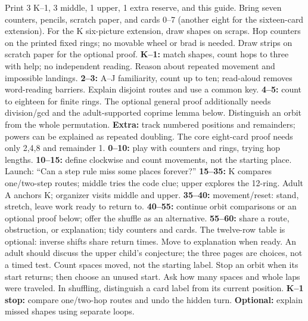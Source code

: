 \documentclass[12pt]{extarticle}
\begin{document}
Print 3 K--1, 3 middle, 1 upper, 1 extra reserve, and this guide. Bring seven counters, pencils, scratch paper, and cards 0--7 (another eight for the sixteen-card extension). For the K six-picture extension, draw shapes on scraps. Hop counters on the printed fixed rings; no movable wheel or brad is needed. Draw strips on scratch paper for the optional proof.
\textbf{K--1:} match shapes, count hops to three with help; no independent reading. Reason about repeated movement and impossible landings. \textbf{2--3:} A--J familiarity, count up to ten; read-aloud removes word-reading barriers. Explain disjoint routes and use a common key. \textbf{4--5:} count to eighteen for finite rings. The optional general proof additionally needs division/gcd and the adult-supported coprime lemma below. Distinguish an orbit from the whole permutation. \textbf{Extra:} track numbered positions and remainders; powers can be explained as repeated doubling. The core eight-card proof needs only 2,4,8 and remainder 1.
\textbf{0--10:} play with counters and rings, trying hop lengths. \textbf{10--15:} define clockwise and count movements, not the starting place. Launch: ``Can a step rule miss some places forever?'' \textbf{15--35:} K compares one/two-step routes; middle tries the code clue; upper explores the 12-ring. Adult A anchors K; organizer visits middle and upper. \textbf{35--40:} movement/reset: stand, stretch, leave work ready to return to. \textbf{40--55:} continue orbit comparisons or an optional proof below; offer the shuffle as an alternative. \textbf{55--60:} share a route, obstruction, or explanation; tidy counters and cards.
The twelve-row table is optional: inverse shifts share return times. Move to explanation when ready. An adult should discuss the upper child's conjecture; the three pages are choices, not a timed test.
Count spaces moved, not the starting label. Stop an orbit when its start returns; then choose an unused start. Ask how many spaces and whole laps were traveled. In shuffling, distinguish a card label from its current position.
\textbf{K--1 stop:} compare one/two-hop routes and undo the hidden turn. \textbf{Optional:} explain missed shapes using separate loops.\par
\end{document}
